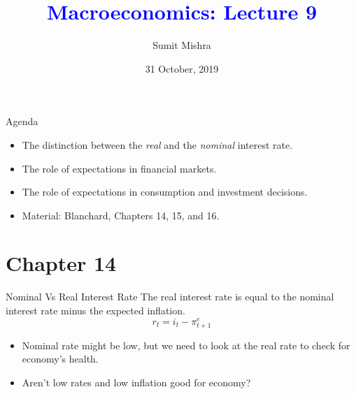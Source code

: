 \documentclass[shownotes,11pt, aspectratio=169]{beamer}
\title[]{\textcolor{blue}{Macroeconomics: Lecture 9}}
\author[SM]{Sumit Mishra}
\institute[IFMR]{\small{\begin{tabular}{c}
IFMR, Sri City \\
\end{tabular}}}
\date{31 October, 2019}
\begin{document}
\begin{frame}{Agenda}
\begin{itemize}
\item The distinction between the \textit{real} and the \textit{nominal} interest rate.
\item The role of expectations in financial markets.
\item The role of expectations in consumption and investment decisions. 
\item Material: Blanchard, Chapters 14, 15, and 16.
\end{itemize}
\end{frame}

\section{Chapter 14}
\begin{frame}{Nominal Vs Real Interest Rate}
The real interest rate is equal to the nominal interest rate minus the expected inflation.
\begin{equation*}
r_t = i_t - \pi_{t+1}^e
\end{equation*}
\end{frame}

\begin{frame}
\begin{center}
\centering
\end{center}
\begin{itemize}
\item Nominal rate might be low, but we need to look at the real rate to check for economy's health.
\pause
\item Aren't low rates and low inflation good for economy?
\end{itemize}
\end{frame}
\end{document}
